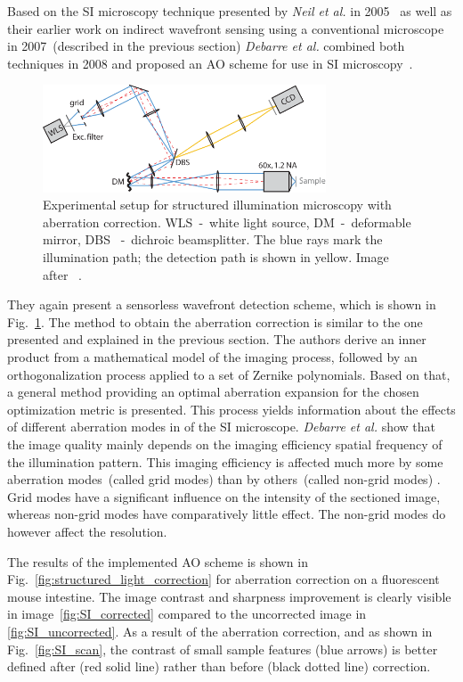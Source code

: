 Based on the SI microscopy technique presented by \emph{Neil et al.} in 2005~\cite{wide_structured_illu_principle} as well as their earlier work on indirect wavefront sensing using a conventional microscope~\cite{wide_AOM_loew_freq} in 2007~(described in the previous section) \emph{Debarre et al.} combined both techniques in 2008 and proposed an AO scheme for use in SI microscopy~\cite{wide_AOM_structured_illu}.  

\begin{figure}
	\centering
		\includegraphics[width=0.75\textwidth]{images/wide_structured_illumination.pdf}
	\caption{Experimental setup for structured illumination microscopy with 
aberration correction. WLS~-~white light source, DM~-~deformable mirror, DBS
~-~dichroic beamsplitter. The blue rays mark the illumination path; the 
detection path is shown in yellow. Image after~\cite{wide_AOM_structured_illu}
.}
	\label{fig:wide_structured_illumination}
\end{figure}

They again present a sensorless wavefront detection scheme, which is shown in Fig.~\ref{fig:wide_structured_illumination}. The method to obtain the aberration correction is similar to the one presented and explained in the previous section. 
The authors derive an inner product from a mathematical model of the imaging process, followed by an orthogonalization process applied to a set of Zernike polynomials. Based on that, a general method providing an optimal aberration expansion for the chosen optimization metric is presented. This process yields  information about the effects of different aberration modes in of the SI microscope. \emph{Debarre et al.} show that the image quality mainly depends on the imaging efficiency spatial frequency of the illumination pattern. This imaging efficiency is affected much more by some aberration modes~(called grid modes) than by others~(called non-grid modes) . Grid modes have a significant influence on the intensity of the sectioned image, whereas non-grid modes have comparatively little effect. The non-grid modes do however affect the resolution. 

The results of the implemented AO scheme is shown in Fig.~\ref{fig:structured_light_correction} for aberration correction on a fluorescent mouse intestine. The image contrast and sharpness improvement is clearly visible in image~\ref{fig:SI_corrected} compared to the uncorrected image in \ref{fig:SI_uncorrected}. As a result of the aberration correction, and as shown in Fig.~\ref{fig:SI_scan}, the contrast of small sample features (blue arrows) is better defined after (red solid line) rather than before (black dotted line) correction. 

